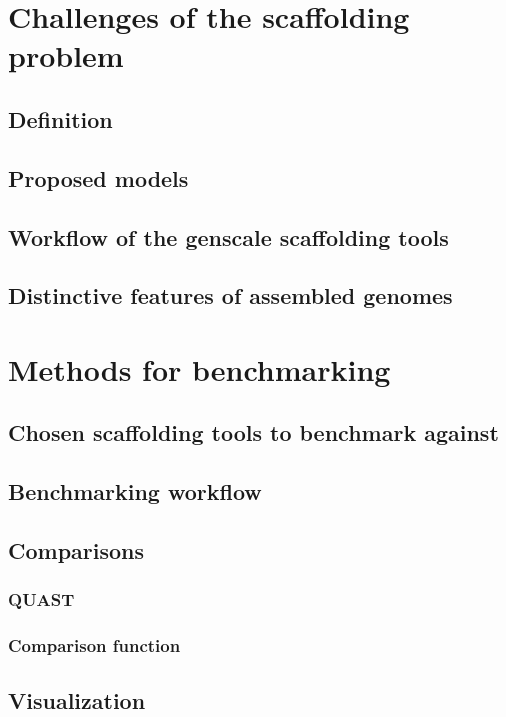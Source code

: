 \documentclass[11pt]{report}
\begin{document}
\chapter{Challenges of the scaffolding problem}
\section{Definition}
\section{Proposed models}
\section{Workflow of the genscale scaffolding tools}
\section{Distinctive features of assembled genomes}
\chapter{Methods for benchmarking}
\section{Chosen scaffolding tools to benchmark against}
\section{Benchmarking workflow}
\section{Comparisons}
\subsection{QUAST}
\subsection{Comparison function}
\section{Visualization}
\end{document}
